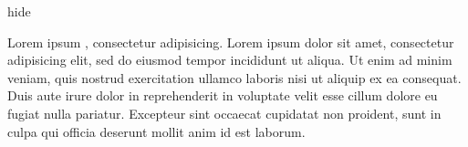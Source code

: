 \documentclass{article}
\begin{document}
{hide}

Lorem ipsum , consectetur adipisicing. Lorem
ipsum dolor sit amet, consectetur adipisicing elit, sed do eiusmod
tempor incididunt ut  aliqua. Ut enim
ad minim veniam, quis nostrud exercitation ullamco laboris nisi ut
aliquip ex ea  consequat. Duis aute irure dolor in
reprehenderit in voluptate velit esse cillum dolore eu fugiat nulla
pariatur. Excepteur sint occaecat cupidatat non proident, sunt in culpa
qui officia deserunt mollit anim id est laborum.
\end{document}
